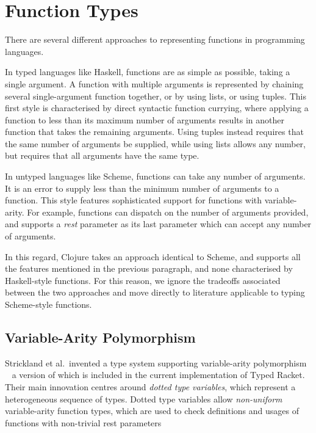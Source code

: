 \section{Function Types}

There are several different approaches to representing functions in programming languages.

In typed languages like Haskell, functions are as simple as possible, taking a single argument.
A function with multiple arguments is represented by chaining several single-argument function
together, or by using lists, or using tuples. This first style is characterised by direct syntactic function currying, where applying
a function to less than its maximum number of arguments results in another function
that takes the remaining arguments.
Using tuples instead requires that the same number of arguments be supplied,
while using lists allows any number, but requires that all arguments have the same type.

In untyped languages like Scheme, functions can take any number of arguments. It is an
error to supply less than the minimum number of arguments to a function.
This style features sophisticated support for functions with variable-arity. For example,
functions can dispatch on the number of arguments provided, and supports a \emph{rest} parameter
as its last parameter which can accept any number of arguments.

In this regard, Clojure takes an approach identical to Scheme, and supports all the features
mentioned in the previous paragraph, and none characterised by Haskell-style functions.
For this reason, we ignore the tradeoffs associated between the two approaches 
and move directly to literature applicable to typing Scheme-style functions.

\subsection{Variable-Arity Polymorphism}
\label{sec:variablearity}

Strickland et al.\ invented a type system supporting variable-arity polymorphism ~\cite{STF09}
a version of which is included in the current implementation of Typed Racket.
Their main innovation centres around \emph{dotted type variables}, which represent a heterogeneous sequence
of types. Dotted type variables allow \emph{non-uniform} variable-arity function types,
which are used to check definitions and usages of functions with non-trivial rest parameters

